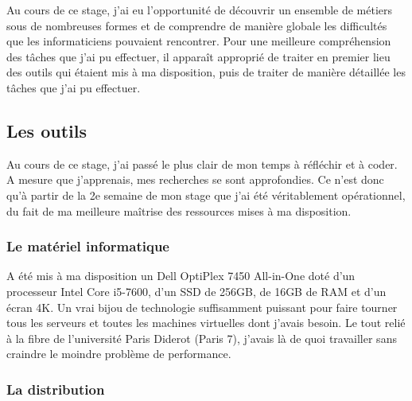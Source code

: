 \documentclass{article}
\begin{document}
Au cours de ce stage, j’ai eu l’opportunité de découvrir un ensemble de métiers sous de nombreuses formes et de comprendre de manière globale les difficultés que les informaticiens pouvaient rencontrer. Pour une meilleure compréhension des tâches que j’ai pu effectuer, il apparaît approprié de traiter en premier lieu des outils qui étaient mis à ma disposition, puis de traiter de manière détaillée les tâches que j’ai pu effectuer.

\subsection{Les outils}

Au cours de ce stage, j’ai passé le plus clair de mon temps à réfléchir et à coder. A mesure que j’apprenais, mes recherches se sont approfondies. Ce n’est donc qu’à partir de la 2e semaine de mon stage que j’ai été véritablement opérationnel, du fait de ma meilleure maîtrise des ressources mises à ma disposition.

\subsubsection{Le matériel informatique}

A été mis à ma disposition un Dell OptiPlex 7450 All-in-One doté d'un processeur Intel Core i5-7600, d'un SSD de 256GB, de 16GB de RAM et d'un écran 4K. Un vrai bijou de technologie suffisamment puissant pour faire tourner tous les serveurs et toutes les machines virtuelles dont j'avais besoin.
Le tout relié à la fibre de l'université Paris Diderot (Paris 7), j'avais là de quoi travailler sans craindre le moindre problème de performance.

\subsubsection{La distribution}
\end{document}
